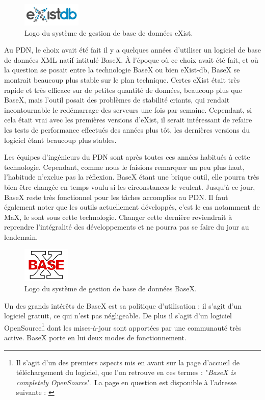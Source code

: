 \documentclass[a4paper,12pt,twoside]{book}
\begin{document}
    \begin{figure}
    \centering
    \includegraphics[width=0.25\textwidth]{img/partie_1/existdb.jpg}
    \caption{Logo du système de gestion de base de données eXist.}
\end{figure}
    
    
    Au \acrshort{PDN}, le choix avait été fait il y a quelques années d'utiliser un logiciel de base de données \acrshort{XML} natif intitulé BaseX. À l'époque où ce choix avait été fait, et où la question se posait entre la technologie BaseX ou bien eXist-db, BaseX se montrait beaucoup plus stable sur le plan technique. Certes eXist était très rapide et très efficace sur de petites quantité de données, beaucoup plus que BaseX, mais l'outil posait des problèmes de stabilité criants, qui rendait incontournable le redémarrage des serveurs une fois par semaine. Cependant, si cela était vrai avec les premières versions d'eXist, il serait intéressant de refaire les tests de performance effectués des années plus tôt, les dernières versions du logiciel étant beaucoup plus stables. 
    
    Les équipes d'ingénieurs du \acrshort{PDN} sont après toutes ces années habitués à cette technologie. Cependant, comme nous le faisions remarquer un peu plus haut, l'habitude n'exclue pas la réflexion. BaseX étant une brique outil, elle pourra très bien être changée en temps voulu si les circonstances le veulent. Jusqu'à ce jour, BaseX reste très fonctionnel pour les tâches accomplies au \acrshort{PDN}. Il faut également noter que les outils actuellement développés, c'est le cas notamment de MaX, le sont sous cette technologie. Changer cette dernière reviendrait à reprendre l'intégralité des développements et ne pourra pas se faire du jour au lendemain.
    
     \begin{figure}
    \centering
    \includegraphics[width=0.20\textwidth]{img/partie_1/baseX.png}
    \caption{Logo du système de gestion de base de données BaseX.}
\end{figure}
         Un des grands intérêts de BaseX est sa politique d'utilisation : il s'agit d'un logiciel gratuit, ce qui n'est pas négligeable. De plus il s'agit d'un logiciel OpenSource\footnote{Il s'agit d'un des premiers aspects mis en avant sur la page d'accueil de téléchargement du logiciel, que l'on retrouve en ces termes : "\textit{BaseX is completely OpenSource}". La page en question est disponible à l'adresse suivante : \cite{map_xml}} dont les mises-à-jour sont apportées par une communauté très active. BaseX porte en lui deux modes de fonctionnement.
         
\end{document}

